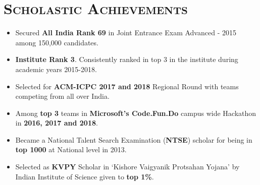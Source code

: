 \documentclass{article}
\newcommand{\tmpsection}[1]{}
\let\tmpsection=\section
\renewcommand{\section}[1]{\tmpsection*{\textsc{#1}}}
\begin{document}
\section{Scholastic Achievements}
\begin{itemize}
    \setlength\itemsep{0.0em}
    \item Secured \textbf{All India Rank 69} in Joint Entrance Exam Advanced - 2015 among 150,000 candidates.
    \item \textbf{Institute Rank 3}. Consistently ranked in top 3 in the institute during academic years 2015-2018.
    \item Selected for \textbf{ACM-ICPC 2017 and 2018} Regional Round with teams competing from all over India.
    \item Among \textbf{top 3} teams in \textbf{Microsoft's Code.Fun.Do} campus wide Hackathon in \textbf{2016, 2017 and 2018}.
    \item Became a National Talent Search Examination (\textbf{NTSE}) scholar for being in \textbf{top 1000} at National level in 2013.
    \item Selected as \textbf{KVPY} Scholar in `Kishore Vaigyanik Protsahan Yojana' by Indian Institute of Science given to \textbf{top 1\%}.
\end{itemize}
\end{document}
